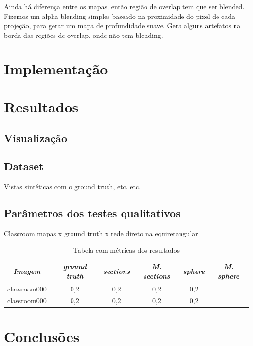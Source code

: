 \documentclass[cic,tc]{iiufrgs}
\begin{document}
Ainda há diferença entre os mapas, então região de overlap tem que ser blended. Fizemos um alpha blending simples baseado na proximidade do pixel de cada projeção, para gerar um mapa de profundidade suave. Gera alguns artefatos na borda das regiões de overlap, onde não tem blending.

\chapter{Implementação}

\chapter{Resultados}

\section{Visualização}

\section{Dataset}
Vistas sintéticas com o ground truth, etc. etc.

\section{Parâmetros dos testes qualitativos}
Classroom mapas x ground truth x rede direto na equiretangular.

\begin{table}[h]
    \caption{Tabela com métricas dos resultados}
    \centering
        \begin{tabular}{c|c|c|c|c|c}
          \hline
          \textit{Imagem} & \textit{ground truth} & \textit{sections} & \textit{M. sections} &  \textit{sphere}  &   \textit{M. sphere} \\
          \hline
          \hline
          classroom000  &  0,2  &  0,2  &  0,2  &  0,2  \\
          classroom000  &  0,2  &  0,2  &  0,2  &  0,2  \\
          \hline
        \end{tabular}
    \label{tbl:results1}
\end{table}


\chapter{Conclusões}



\end{document}
